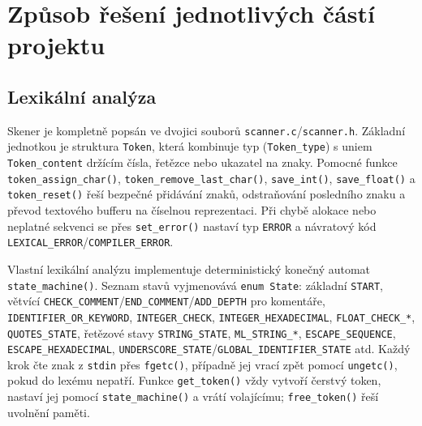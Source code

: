 \documentclass[a4paper,12pt]{article}
\begin{document}
\section{Způsob řešení jednotlivých částí projektu}

\subsection{Lexikální analýza}
Skener je kompletně popsán ve dvojici souborů \texttt{scanner.c}/\texttt{scanner.h}. Základní jednotkou je struktura \texttt{Token}, která kombinuje typ (\texttt{Token\_type}) s uniem \texttt{Token\_content} držícím čísla, řetězce nebo ukazatel na znaky. Pomocné funkce \texttt{token\_assign\_char()}, \texttt{token\_remove\_last\_char()}, \texttt{save\_int()}, \texttt{save\_float()} a \texttt{token\_reset()} řeší bezpečné přidávání znaků, odstraňování posledního znaku a převod textového bufferu na číselnou reprezentaci. Při chybě alokace nebo neplatné sekvenci se přes \texttt{set\_error()} nastaví typ \texttt{ERROR} a návratový kód \texttt{LEXICAL\_ERROR}/\texttt{COMPILER\_ERROR}.

Vlastní lexikální analýzu implementuje deterministický konečný automat \texttt{state\_machine()}. Seznam stavů vyjmenovává \texttt{enum State}: základní \texttt{START}, větvící \texttt{CHECK\_COMMENT}/\texttt{END\_COMMENT}/\texttt{ADD\_DEPTH} pro komentáře, \texttt{IDENTIFIER\_OR\_KEYWORD}, \texttt{INTEGER\_CHECK}, \texttt{INTEGER\_HEXADECIMAL}, \texttt{FLOAT\_CHECK\_*}, \texttt{QUOTES\_STATE}, řetězové stavy \texttt{STRING\_STATE}, \texttt{ML\_STRING\_*}, \texttt{ESCAPE\_SEQUENCE}, \texttt{ESCAPE\_HEXADECIMAL}, \texttt{UNDERSCORE\_STATE}/\texttt{GLOBAL\_IDENTIFIER\_STATE} atd. Každý krok čte znak z \texttt{stdin} přes \texttt{fgetc()}, případně jej vrací zpět pomocí \texttt{ungetc()}, pokud do lexému nepatří. Funkce \texttt{get\_token()} vždy vytvoří čerstvý token, nastaví jej pomocí \texttt{state\_machine()} a vrátí volajícímu; \texttt{free\_token()} řeší uvolnění paměti.
\end{document}
